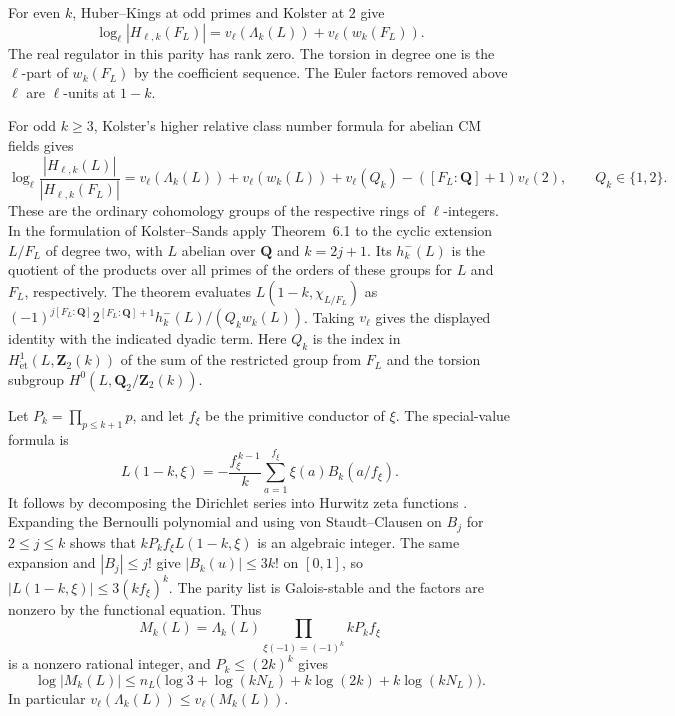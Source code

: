 For even \(k\), Huber--Kings at odd primes and Kolster at \(2\)
give
\[
 \log_\ell|H_{\ell,k}(F_L)|
    =v_\ell(\Lambda_k(L))+v_\ell(w_k(F_L)).
\]
The real regulator in this parity has rank zero. The torsion
in degree one is the \(\ell\)-part of \(w_k(F_L)\) by the
coefficient sequence. The Euler factors removed above \(\ell\)
are \(\ell\)-units at \(1-k\).
\cite[Theorems~1.3.1 and~1.4.1]{f2-huber-kings}
\cite[Appendix~A, Theorem~A.1 and Corollary~A.3]{f2-rognes-weibel-dyadic}

For odd \(k\ge3\), Kolster's higher relative class number formula
for abelian CM fields gives
\[
 \log_\ell\frac{|H_{\ell,k}(L)|}{|H_{\ell,k}(F_L)|}
 =v_\ell(\Lambda_k(L))+v_\ell(w_k(L))
    +v_\ell(Q_k)-([F_L:\mathbf Q]+1)v_\ell(2),
 \qquad Q_k\in\{1,2\}.
\]
These are the ordinary cohomology groups of the respective rings
of \(\ell\)-integers. In the formulation of Kolster--Sands
apply Theorem~6.1 to the cyclic extension \(L/F_L\) of degree
two, with \(L\) abelian over \(\mathbf Q\) and \(k=2j+1\).
Its \(h^-_k(L)\) is the quotient of the products over all primes
of the orders of these groups for \(L\) and \(F_L\), respectively.
The theorem evaluates \(L(1-k,\chi_{L/F_L})\) as
\((-1)^{j[F_L:\mathbf Q]}2^{[F_L:\mathbf Q]+1}
h^-_k(L)/(Q_k w_k(L))\). Taking \(v_\ell\) gives the displayed
identity with the indicated dyadic term. Here \(Q_k\) is the
index in \(H^1_{\mathrm{\acute et}}(L,\mathbf Z_2(k))\) of the
sum of the restricted group from \(F_L\) and the torsion subgroup
\(H^0(L,\mathbf Q_2/\mathbf Z_2(k))\).
\cite{f2-kolster-relative}\cite[\S\S2 and~5, Theorem~6.1]{f2-kolster-sands}
\cite[Propositions~1.2--1.3 and p.~225]{f2-voight-relative}

Let \(P_k=\prod_{p\le k+1}p\), and let \(f_\xi\) be the primitive
conductor of \(\xi\). The special-value formula is
\[
 L(1-k,\xi)=-\frac{f_\xi^{\,k-1}}{k}
      \sum_{a=1}^{f_\xi}\xi(a)B_k(a/f_\xi).
\]
It follows by decomposing the Dirichlet series into Hurwitz zeta
functions \cite[25.11.14 and~25.11.36]{dlmf}.
Expanding the Bernoulli polynomial and using von Staudt--Clausen
on \(B_j\) for \(2\le j\le k\) shows that
\(kP_k f_\xi L(1-k,\xi)\) is an algebraic integer.
The same expansion and \(|B_j|\le j!\) give
\(|B_k(u)|\le3k!\) on \([0,1]\), so
\(|L(1-k,\xi)|\le3(k f_\xi)^k\).
The parity list is Galois-stable and the factors are nonzero
by the functional equation. Thus
\[
 M_k(L)=\Lambda_k(L)\prod_{\xi(-1)=(-1)^k} kP_k f_\xi
\]
is a nonzero rational integer, and \(P_k\le(2k)^k\) gives
\[
 \log|M_k(L)|
 \le n_L\bigl(\log3+\log(kN_L)+k\log(2k)+k\log(kN_L)\bigr).
\]
In particular \(v_\ell(\Lambda_k(L))\le v_\ell(M_k(L))\).

